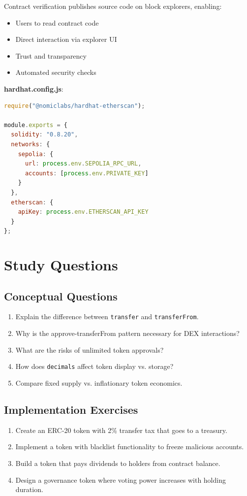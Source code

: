 \documentclass[11pt,a4paper]{article}
\begin{document}
Contract verification publishes source code on block explorers, enabling:
\begin{itemize}
  \item Users to read contract code
  \item Direct interaction via explorer UI
  \item Trust and transparency
  \item Automated security checks
\end{itemize}

\textbf{hardhat.config.js}:
\begin{lstlisting}[language=JavaScript]
require("@nomiclabs/hardhat-etherscan");

module.exports = {
  solidity: "0.8.20",
  networks: {
    sepolia: {
      url: process.env.SEPOLIA_RPC_URL,
      accounts: [process.env.PRIVATE_KEY]
    }
  },
  etherscan: {
    apiKey: process.env.ETHERSCAN_API_KEY
  }
};
\end{lstlisting}

\section{Study Questions}

\subsection{Conceptual Questions}

\begin{enumerate}
  \item Explain the difference between \texttt{transfer} and \texttt{transferFrom}.
  \item Why is the approve-transferFrom pattern necessary for DEX interactions?
  \item What are the risks of unlimited token approvals?
  \item How does \texttt{decimals} affect token display vs. storage?
  \item Compare fixed supply vs. inflationary token economics.
\end{enumerate}

\subsection{Implementation Exercises}

\begin{enumerate}
  \item Create an ERC-20 token with 2\% transfer tax that goes to a treasury.
  \item Implement a token with blacklist functionality to freeze malicious accounts.
  \item Build a token that pays dividends to holders from contract balance.
  \item Design a governance token where voting power increases with holding duration.
\end{enumerate}
\end{document}
